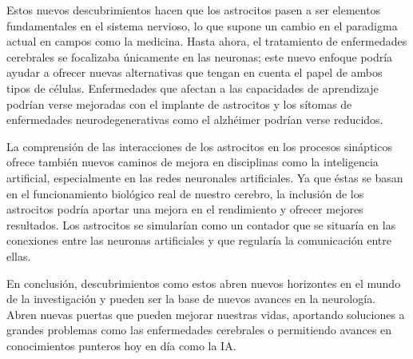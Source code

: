 \documentclass{article}
\begin{document}
\bigskip

\noindent
Estos nuevos descubrimientos hacen que los astrocitos pasen a ser elementos fundamentales en el sistema nervioso, lo que supone un cambio en el paradigma actual
en campos como la medicina. Hasta ahora, el tratamiento de enfermedades cerebrales se focalizaba únicamente en las neuronas; este nuevo enfoque podría ayudar a 
ofrecer nuevas alternativas que tengan en cuenta el papel de ambos tipos de células. Enfermedades que afectan a las capacidades de aprendizaje podrían verse mejoradas
con el implante de astrocitos y los sítomas de enfermedades neurodegenerativas como el alzhéimer podrían verse reducidos.
\bigskip

\noindent
La comprensión de las interacciones de los astrocitos en los procesos sinápticos ofrece también nuevos caminos de mejora en disciplinas como la inteligencia artificial,
especialmente en las redes neuronales artificiales. Ya que éstas se basan en el funcionamiento biológico real de nuestro cerebro, la inclusión de los astrocitos podría
aportar una mejora en el rendimiento y ofrecer mejores resultados. Los astrocitos se simularían como un contador que se situaría en las conexiones entre las 
neuronas artificiales y que regularía la comunicación entre ellas.
\bigskip

\noindent
En conclusión, descubrimientos como estos abren nuevos horizontes en el mundo de la investigación y pueden ser la base de nuevos avances en la neurología.
Abren nuevas puertas que pueden mejorar nuestras vidas, aportando soluciones a grandes problemas como las enfermedades cerebrales o permitiendo avances 
en conocimientos punteros hoy en día como la IA.
\end{document}
